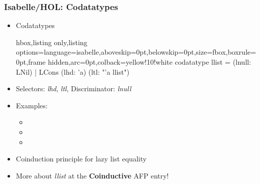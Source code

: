 \documentclass[aspectratio=169,10pt]{beamer}
\begin{document}
\begin{frame}[fragile]
  \frametitle{Isabelle/HOL: Codatatypes}
  \begin{itemize}
    \item Codatatypes
          \vspace*{-1ex}
          \begin{tcblisting}{hbox,listing only,listing options={language=isabelle,aboveskip=0pt,belowskip=0pt},size=fbox,boxrule=0pt,frame hidden,arc=0pt,colback=yellow!10!white}
codatatype llist = (lnull: LNil) | LCons (lhd: 'a) (ltl: "'a llist")
          \end{tcblisting}
          \vspace*{-1ex}
    \item Selectors: \textit{lhd}, \textit{ltl}, Discriminator: \textit{lnull}
    \item Examples:
          \begin{itemize}
            \item {}
            \item {}
            \item {}
          \end{itemize}
          \vspace*{-1ex}
          \pause
    \item Coinduction principle for lazy list equality
    \item More about \textit{llist} at the \textbf{Coinductive} AFP entry!
  \end{itemize}
\end{frame}
\end{document}
